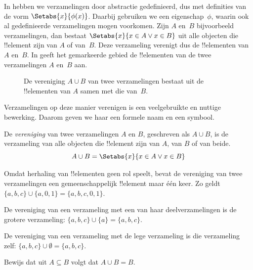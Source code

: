 \documentclass[../../../include/open-logic-section]{subfiles}
\begin{document}

\begin{explain}
In  hebben we verzamelingen door abstractie
gedefinieerd, dus met definities van de vorm $\Setabs{x}{\phi(x)}$.
Daarbij gebruiken we een eigenschap~$\phi$, waarin ook al gedefinieerde
verzamelingen mogen voorkomen. Zijn $A$ en~$B$ bijvoorbeeld verzamelingen,
dan bestaat $\Setabs{x}{x \in A \lor x \in B}$ uit alle objecten die
!!{element} zijn van $A$ of van~$B$. Deze verzameling verenigt dus de
!!{element}en van $A$ en~$B$. In  geeft het gemarkeerde
gebied de !!{element}en van de twee verzamelingen $A$ en~$B$ aan.

\begin{figure}
  \caption{De vereniging $A \cup B$ van twee verzamelingen bestaat uit de
   !!{element}en van $A$ samen met die van~$B$.}
\end{figure}

Verzamelingen op deze manier verenigen is een veelgebruikte en nuttige
bewerking. Daarom geven we haar een formele naam en een symbool.
\end{explain}

\begin{defn}[Vereniging]
De \emph{vereniging} van twee verzamelingen $A$ en $B$, geschreven als
$A \cup B$, is de verzameling van alle objecten die !!{element} zijn van
$A$, van $B$ of van beide.
\[
A \cup B = \Setabs{x}{x \in A \lor x \in B}
\]
\end{defn}

\begin{ex}
Omdat herhaling van !!{element}en geen rol speelt, bevat de vereniging van
twee verzamelingen een gemeenschappelijk !!{element} maar één keer. Zo geldt
$\{ a, b, c\} \cup \{ a, 0, 1\} = \{a, b, c, 0, 1\}$.

De vereniging van een verzameling met een van haar deelverzamelingen is
de grotere verzameling: $\{a, b, c \} \cup \{a \} = \{a, b, c\}$.

De vereniging van een verzameling met de lege verzameling is die verzameling
zelf: $\{a, b, c \} \cup \emptyset = \{a, b, c \}$.
\end{ex}

\begin{prob}
Bewijs dat uit $A \subseteq B$ volgt dat $A \cup B = B$.
\end{prob}
\end{document}
